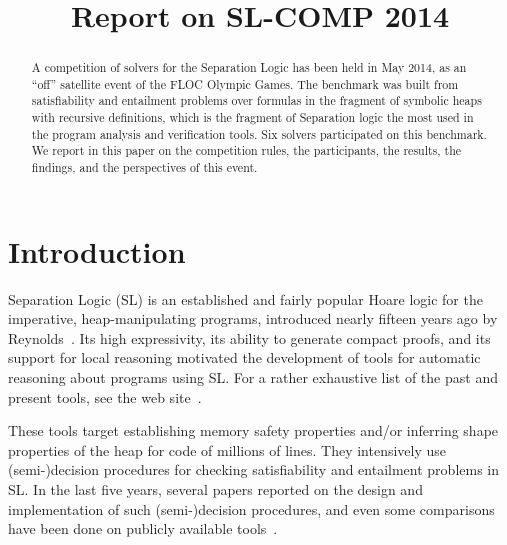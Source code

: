 \documentclass{llncs}
\title{Report on SL-COMP 2014}
\author{}
\institute{}
\date{}
\begin{document}
\sloppy
\maketitle


\begin{abstract}
A competition of solvers for the Separation Logic 
has been held in May 2014, 
as an ``off'' satellite event of the FLOC Olympic Games.
The benchmark was built from satisfiability and entailment problems
over formulas in the fragment of symbolic heaps with recursive definitions, 
which is the fragment of Separation logic the most used in the program analysis and verification tools.
Six solvers participated on this benchmark. 
We report in this paper on 
the competition rules, the participants, the results, the findings, and  
the perspectives of this event.
\end{abstract}


\section{Introduction}

Separation Logic (SL) is an established and fairly popular Hoare logic 
for the imperative, heap-manipulating programs, 
introduced nearly fifteen years ago by Reynolds~\cite{Reynolds99,OHearnRY01,Reynolds02}. 
%
Its high expressivity, its ability to generate compact proofs, and 
its support for local reasoning 
motivated the development of tools for automatic reasoning about programs using SL.
For a rather exhaustive list of the past and present tools, see the web site~\cite{OHearn-SLsite}.

These tools target establishing memory safety properties and/or inferring shape properties of the heap for code of millions of lines.
They intensively use (semi-)decision procedures for checking satisfiability and entailment problems in SL.
In the last five years, several papers reported on the design and implementation of such (semi-)decision procedures, and even some comparisons have been done on publicly available tools~\cite{HasseIOP13}.
\end{document}
